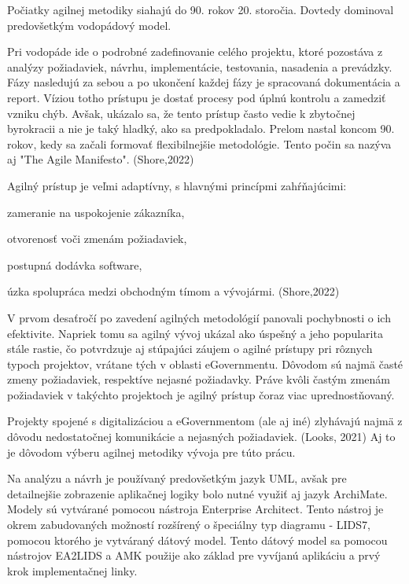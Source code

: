 Počiatky agilnej metodiky siahajú do 90. rokov 20. storočia. Dovtedy dominoval predovšetkým vodopádový model.

Pri vodopáde ide o podrobné zadefinovanie celého projektu, ktoré pozostáva z analýzy požiadaviek, návrhu, implementácie, testovania, nasadenia a prevádzky. Fázy nasledujú za sebou a po ukončení každej fázy je spracovaná dokumentácia a report. Víziou totho prístupu je dostať procesy pod úplnú kontrolu a zamedziť vzniku chýb. Avšak, ukázalo sa, že tento prístup často vedie k zbytočnej byrokracii a nie je taký hladký, ako sa predpokladalo. Prelom nastal koncom 90. rokov, kedy sa začali formovať flexibilnejšie metodológie. Tento počin sa nazýva aj "The Agile Manifesto". \scr(Shore,2022)

\blank
Agilný prístup je veľmi adaptívny, s hlavnými princípmi zahŕňajúcimi:

\startitemize
\item zameranie na uspokojenie zákazníka, 
\item otvorenosť voči zmenám požiadaviek,
\item postupná dodávka software,
\item úzka spolupráca medzi obchodným tímom a vývojármi. \scr(Shore,2022) 
\stopitemize

V prvom desaťročí po zavedení agilných metodológií panovali pochybnosti o ich efektivite. Napriek tomu sa agilný vývoj ukázal ako úspešný a jeho popularita stále rastie, čo potvrdzuje aj stúpajúci záujem o agilné prístupy pri rôznych typoch projektov, vrátane tých v oblasti eGovernmentu. Dôvodom sú najmä časté zmeny požiadaviek, respektíve nejasné požiadavky. Práve kvôli častým zmenám požiadaviek v takýchto projektoch je agilný prístup čoraz viac uprednostňovaný.

Projekty spojené s digitalizáciou a eGovernmentom (ale aj iné) zlyhávajú najmä z dôvodu nedostatočnej komunikácie a nejasných požiadaviek. \scr(Looks, 2021) Aj to je dôvodom výberu agilnej metodiky vývoja pre túto prácu.

Na analýzu a návrh je používaný predovšetkým jazyk UML, avšak pre detailnejšie zobrazenie aplikačnej logiky bolo nutné využiť aj jazyk ArchiMate. Modely sú vytvárané pomocou nástroja Enterprise Architect. Tento nástroj je okrem zabudovaných možností rozšírený o špeciálny typ diagramu - LIDS7, pomocou ktorého je vytváraný dátový model. Tento dátový model sa pomocou nástrojov EA2LIDS a AMK použije ako základ pre vyvíjanú aplikáciu a prvý krok implementačnej linky. 

